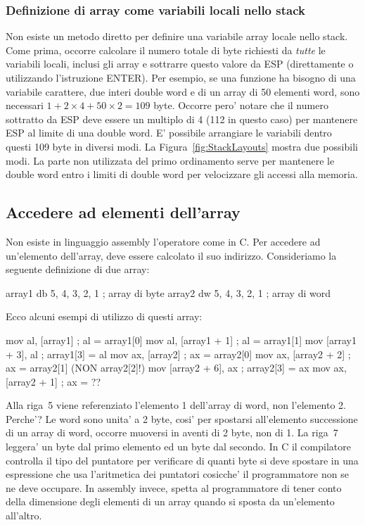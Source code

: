 \subsubsection{Definizione di array come variabili locali nello stack}

Non esiste un metodo diretto per definire una variabile array locale
nello stack. Come prima, occorre calcolare il numero totale di
byte richiesti da \emph{tutte} le variabili locali, inclusi gli
array e sottrarre questo valore da ESP (direttamente o utilizzando
l'istruzione {\code ENTER}). Per esempio, se una funzione ha bisogno
di una variabile carattere, due interi double word e di un array di 50 
elementi word, sono necessari $1 + 2 \times 4 + 50 \times 2 =
109$ byte. Occorre pero' notare che il numero sottratto da ESP deve
essere un multiplo di 4 (112 in questo caso) per mantenere ESP
al limite di una double word. E' possibile arrangiare le variabili
dentro questi 109 byte in diversi modi. La Figura~\ref{fig:StackLayouts}
mostra due possibili modi. La parte non utilizzata del primo ordinamento
serve per mantenere le double word entro i limiti di double word per
velocizzare gli accessi alla memoria. 

\subsection{Accedere ad elementi dell'array}

Non esiste in linguaggio assembly l'operatore {\code [ ]} come in C.
Per accedere ad un'elemento dell'array, deve essere calcolato il suo
indirizzo. Consideriamo la seguente definizione di due array:
\begin{AsmCodeListing}[frame=none, numbers=none]
array1       db     5, 4, 3, 2, 1     ; array di byte
array2       dw     5, 4, 3, 2, 1     ; array di word
\end{AsmCodeListing}
Ecco alcuni esempi di utilizzo di questi array:
\begin{AsmCodeListing}[frame=none]
      mov    al, [array1]             ; al = array1[0]
      mov    al, [array1 + 1]         ; al = array1[1]
      mov    [array1 + 3], al         ; array1[3] = al
      mov    ax, [array2]             ; ax = array2[0]
      mov    ax, [array2 + 2]         ; ax = array2[1] (NON array2[2]!)
      mov    [array2 + 6], ax         ; array2[3] = ax
      mov    ax, [array2 + 1]         ; ax = ??
\end{AsmCodeListing}
Alla riga~5 viene referenziato l'elemento 1 dell'array di word, non l'elemento
2. Perche'? Le word sono unita' a 2 byte, cosi' per spostarsi all'elemento
successione di un array di word, occorre muoversi in aventi di 2 byte, non di 1. 
La riga~7 leggera' un byte dal primo elemento ed un byte dal secondo. In C
il compilatore controlla il tipo del puntatore per verificare di quanti
byte si deve spostare in una espressione che usa l'aritmetica dei puntatori
cosicche' il programmatore non se ne deve occupare. In assembly invece,
spetta al programmatore di tener conto della dimensione degli elementi di un
array quando si sposta da un'elemento all'altro.


